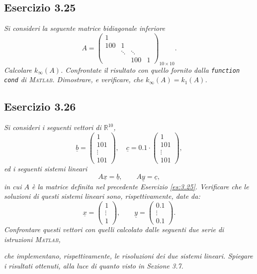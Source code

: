 \subsection{Esercizio 3.25}
\emph{Si consideri la seguente matrice \textit{bidiagonale inferiore}}
\[
  A=
  \begin{pmatrix}
    1 & & &\\
    100 & 1 & &\\
    & \ddots & \ddots &\\
    & & 100 & 1
  \end{pmatrix}_{10\times 10}.
\]
\emph{Calcolare $k_{\infty}(A)$. Confrontate il risultato con quello fornito dalla \lstinline{function cond} di \textsc{Matlab}. Dimostrare, e verificare, che $k_{\infty}(A)=k_1(A)$.}
\subsection{Esercizio 3.26}
\emph{Si consideri i seguenti vettori di $\mathbb{R}^{10}$,}
\[
  \underline{b}=
  \begin{pmatrix}
    1\\
    101\\
    \vdots\\
    101
  \end{pmatrix},
  \quad \underline{c}=0.1\cdot
  \begin{pmatrix}
    1\\
    101\\
    \vdots\\
    101
  \end{pmatrix},
\]
\emph{ed i seguenti sistemi lineari
$$A\underline{x}=\underline{b},\qquad A\underline{y}=\underline{c},$$
in cui $A$ è la matrice definita nel precedente Esercizio \ref{es:3.25}. Verificare che le soluzioni di questi sistemi lineari sono, rispettivamente, date da:}
\[
  \underline{x}=
  \begin{pmatrix}
    1\\
    \vdots\\
    1
  \end{pmatrix},
  \qquad \underline{y}=
  \begin{pmatrix}
    0.1\\
    \vdots\\
    0.1
  \end{pmatrix}.
\]
\emph{Confrontare questi vettori con quelli calcolato dalle seguenti due serie di istruzioni \textsc{Matlab},}

\emph{che implementano, rispettivamente, le risoluzioni dei due sistemi lineari. Spiegare i risultati ottenuti, alla luce di quanto visto in Sezione 3.7.}

